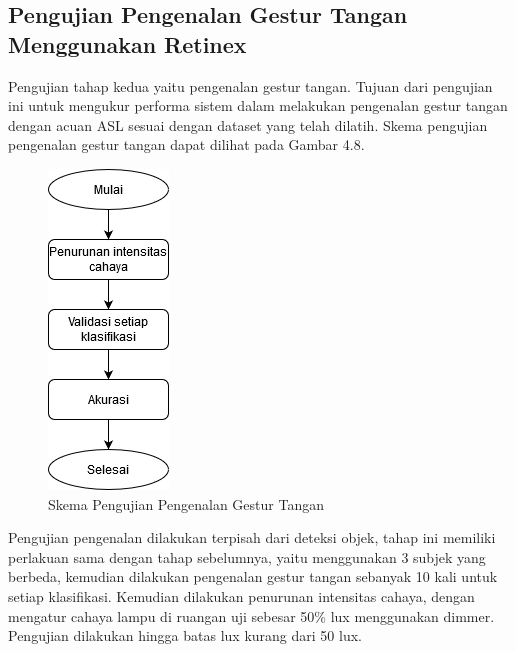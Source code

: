 \subsection{Pengujian Pengenalan Gestur Tangan Menggunakan Retinex}
Pengujian tahap kedua yaitu pengenalan gestur tangan. Tujuan dari pengujian ini untuk mengukur performa sistem dalam melakukan pengenalan gestur tangan dengan acuan ASL sesuai dengan dataset yang telah dilatih. Skema pengujian pengenalan gestur tangan dapat dilihat pada Gambar 4.8.
\begin{figure}[H]
	\centering
	\includegraphics[width=0.2\linewidth]{"proses pengujian sistem"}
	\caption{Skema Pengujian Pengenalan Gestur Tangan}
	\label{fig:screenshot-from-2020-03-04-22-24-45}
\end{figure}
Pengujian pengenalan dilakukan terpisah dari deteksi objek, tahap ini memiliki perlakuan sama dengan tahap sebelumnya, yaitu menggunakan 3 subjek yang berbeda, kemudian dilakukan pengenalan gestur tangan sebanyak 10 kali untuk setiap klasifikasi.
Kemudian dilakukan penurunan intensitas cahaya, dengan mengatur cahaya lampu di ruangan uji sebesar 50\% lux menggunakan dimmer. Pengujian dilakukan hingga batas lux kurang dari 50 lux.
